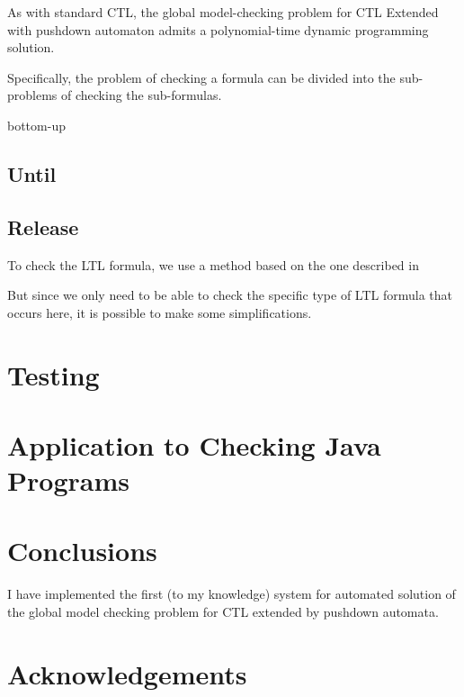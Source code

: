 \documentclass[11pt]{article}
\begin{document}
As with standard CTL, the global model-checking problem for CTL Extended with
pushdown automaton admits a polynomial-time dynamic programming solution.

Specifically, the problem of checking a formula can be divided into the
sub-problems of checking the sub-formulas. %

bottom-up

\subsection{Until}

\subsection{Release}
To check the LTL formula, we use a method based on the one described in \cite{EHRS00b} %

But since we only need to be able to check the specific type of LTL formula
that occurs here, it is possible to make some simplifications.

\section{Testing}





\section{Application to Checking Java Programs}


\section{Conclusions}

I have implemented the first (to my knowledge) system for automated solution of
the global model checking problem for CTL extended by pushdown automata.





\section{Acknowledgements}
\end{document}
